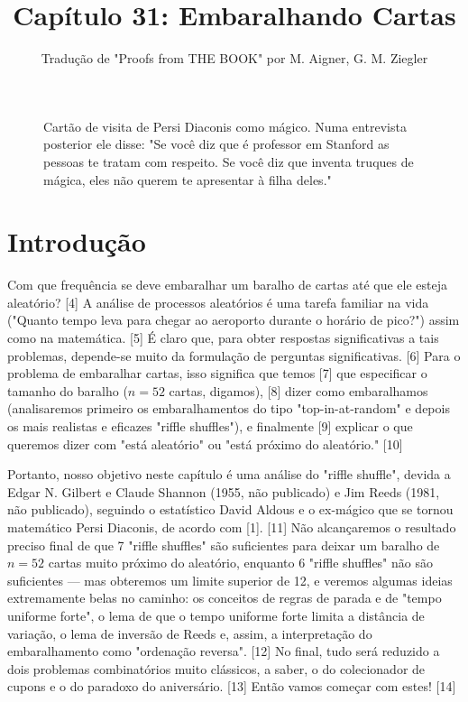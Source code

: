 \documentclass[a4paper]{article}
\title{Capítulo 31: Embaralhando Cartas}
\author{Tradução de "Proofs from THE BOOK" por M. Aigner, G. M. Ziegler}
\date{}
\begin{document}
\maketitle

\begin{figure}[h!]
    \centering
    \caption{Cartão de visita de Persi Diaconis como mágico. Numa entrevista posterior ele disse: "Se você diz que é professor em Stanford as pessoas te tratam com respeito. Se você diz que inventa truques de mágica, eles não querem te apresentar à filha deles."}
\end{figure}

\section*{Introdução}

Com que frequência se deve embaralhar um baralho de cartas até que ele esteja aleatório? [4] A análise de processos aleatórios é uma tarefa familiar na vida ("Quanto tempo leva para chegar ao aeroporto durante o horário de pico?") assim como na matemática. [5] É claro que, para obter respostas significativas a tais problemas, depende-se muito da formulação de perguntas significativas. [6] Para o problema de embaralhar cartas, isso significa que temos [7] que especificar o tamanho do baralho ($n=52$ cartas, digamos), [8] dizer como embaralhamos (analisaremos primeiro os embaralhamentos do tipo "top-in-at-random" e depois os mais realistas e eficazes "riffle shuffles"), e finalmente [9] explicar o que queremos dizer com "está aleatório" ou "está próximo do aleatório." [10]

Portanto, nosso objetivo neste capítulo é uma análise do "riffle shuffle", devida a Edgar N. Gilbert e Claude Shannon (1955, não publicado) e Jim Reeds (1981, não publicado), seguindo o estatístico David Aldous e o ex-mágico que se tornou matemático Persi Diaconis, de acordo com [1]. [11] Não alcançaremos o resultado preciso final de que 7 "riffle shuffles" são suficientes para deixar um baralho de $n=52$ cartas muito próximo do aleatório, enquanto 6 "riffle shuffles" não são suficientes — mas obteremos um limite superior de 12, e veremos algumas ideias extremamente belas no caminho: os conceitos de regras de parada e de "tempo uniforme forte", o lema de que o tempo uniforme forte limita a distância de variação, o lema de inversão de Reeds e, assim, a interpretação do embaralhamento como "ordenação reversa". [12] No final, tudo será reduzido a dois problemas combinatórios muito clássicos, a saber, o do colecionador de cupons e o do paradoxo do aniversário. [13] Então vamos começar com estes! [14]
\end{document}
